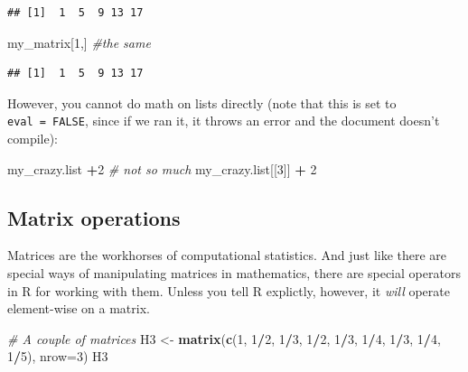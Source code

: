 \documentclass[]{article}
\newenvironment{Shaded}{\begin{snugshade}}{\end{snugshade}}
\newcommand{\KeywordTok}[1]{\textcolor[rgb]{0.13,0.29,0.53}{\textbf{#1}}}
\newcommand{\DataTypeTok}[1]{\textcolor[rgb]{0.13,0.29,0.53}{#1}}
\newcommand{\DecValTok}[1]{\textcolor[rgb]{0.00,0.00,0.81}{#1}}
\newcommand{\StringTok}[1]{\textcolor[rgb]{0.31,0.60,0.02}{#1}}
\newcommand{\CommentTok}[1]{\textcolor[rgb]{0.56,0.35,0.01}{\textit{#1}}}
\newcommand{\OperatorTok}[1]{\textcolor[rgb]{0.81,0.36,0.00}{\textbf{#1}}}
\newcommand{\NormalTok}[1]{#1}
\begin{document}
\begin{verbatim}
## [1]  1  5  9 13 17
\end{verbatim}

\begin{Shaded}
\begin{Highlighting}[]
\NormalTok{my_matrix[}\DecValTok{1}\NormalTok{,]  }\CommentTok{#the same}
\end{Highlighting}
\end{Shaded}

\begin{verbatim}
## [1]  1  5  9 13 17
\end{verbatim}

However, you cannot do math on lists directly (note that this is set to
\texttt{eval\ =\ FALSE}, since if we ran it, it throws an error and the
document doesn't compile):

\begin{Shaded}
\begin{Highlighting}[]
\NormalTok{my_crazy.list }\OperatorTok{+}\DecValTok{2} \CommentTok{# not so much}
\NormalTok{my_crazy.list[[}\DecValTok{3}\NormalTok{]] }\OperatorTok{+}\StringTok{ }\DecValTok{2}
\end{Highlighting}
\end{Shaded}

\clearpage

\subsection{Matrix operations}\label{matrix-operations}

Matrices are the workhorses of computational statistics. And just like
there are special ways of manipulating matrices in mathematics, there
are special operators in R for working with them. Unless you tell R
explictly, however, it \emph{will} operate element-wise on a matrix.

\begin{Shaded}
\begin{Highlighting}[]
\CommentTok{# A couple of matrices}
\NormalTok{H3 <-}\StringTok{ }\KeywordTok{matrix}\NormalTok{(}\KeywordTok{c}\NormalTok{(}\DecValTok{1}\NormalTok{, }\DecValTok{1}\OperatorTok{/}\DecValTok{2}\NormalTok{, }\DecValTok{1}\OperatorTok{/}\DecValTok{3}\NormalTok{, }\DecValTok{1}\OperatorTok{/}\DecValTok{2}\NormalTok{, }\DecValTok{1}\OperatorTok{/}\DecValTok{3}\NormalTok{, }\DecValTok{1}\OperatorTok{/}\DecValTok{4}\NormalTok{, }\DecValTok{1}\OperatorTok{/}\DecValTok{3}\NormalTok{, }\DecValTok{1}\OperatorTok{/}\DecValTok{4}\NormalTok{, }\DecValTok{1}\OperatorTok{/}\DecValTok{5}\NormalTok{), }\DataTypeTok{nrow=}\DecValTok{3}\NormalTok{)}
\NormalTok{H3}
\end{Highlighting}
\end{Shaded}
\end{document}
